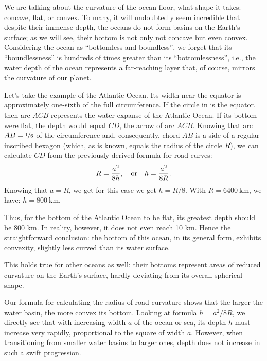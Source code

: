We are talking about the curvature of the ocean floor, what shape it takes: concave, flat, or convex. To many, it will undoubtedly seem incredible that despite their immense depth, the oceans do not form basins on the Earth's surface; as we will see, their bottom is not only not concave but even convex. Considering the ocean as ``bottomless and boundless'', we forget that its ``boundlessness'' is hundreds of times greater than its ``bottomlessness'', i.e., the water depth of the ocean represents a far-reaching layer that, of course, mirrors the curvature of our planet.

Let's take the example of the Atlantic Ocean. Its width near the equator is approximately one-sixth of the full circumference. If the circle in  is the equator, then arc $ACB$ represents the water expanse of the Atlantic Ocean. If its bottom were flat, the depth would equal $CD$, the arrow of arc $ACB$. Knowing that arc $AB = \nicefrac{1}{6}$ of the circumference and, consequently, chord $AB$ is a side of a regular inscribed hexagon (which, as is known, equals the radius of the circle $R$), we can calculate $CD$ from the previously derived formula for road curves:
\begin{equation*}%
R = \frac{a^{2}}{8h}, \qor h = \frac{a^{2}}{8R}.
\end{equation*}
Knowing that $a = R$, we get for this case we get $h = R/8$. With $R = \SI{6400}{\kilo\meter}$, we have: $h = \SI{800}{\kilo\meter}$.

Thus, for the bottom of the Atlantic Ocean to be flat, its greatest depth should be 800 km. In reality, however, it does not even reach 10 km. Hence the straightforward conclusion: the bottom of this ocean, in its general form, exhibits convexity, slightly less curved than its water surface.

This holds true for other oceans as well: their bottoms represent areas of reduced curvature on the Earth's surface, hardly deviating from its overall spherical shape.

Our formula for calculating the radius of road curvature shows that the larger the water basin, the more convex its bottom. Looking at formula $h = a^{2}/8R$, we directly see that with increasing width $a$ of the ocean or sea, its depth $h$ must increase very rapidly, proportional to the square of width $a$. However, when transitioning from smaller water basins to larger ones, depth does not increase in such a swift progression. 

